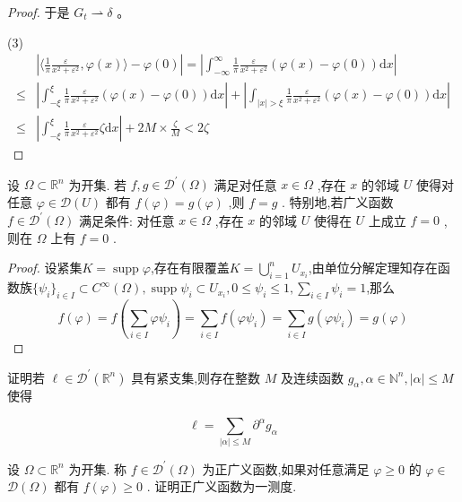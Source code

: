 \documentclass[lang=cn,newtx,10pt,scheme=chinese,thmcnt=chapter]{elegantbook}
\newcommand{\dif}{\mathrm{d}}
\begin{document}
\begin{problemset}
\begin{proof}
于是 $G_t \rightharpoonup \delta$ 。

    (3)    \begin{equation*}
        \begin{aligned}
          & \left| \langle \frac{1}{\pi }\frac{\varepsilon }{{x}^{2} + {\varepsilon }^{2}},\varphi(x)\rangle-\varphi(0)\right|=\left|\int_{-\infty}^\infty \frac{1}{\pi }\frac{\varepsilon }{{x}^{2} + {\varepsilon }^{2}} (\varphi(x)-\varphi(0))\dif x \right|\\
           \leqslant& \left|\int_{-\xi}^\xi\frac{1}{\pi }\frac{\varepsilon }{{x}^{2} + {\varepsilon }^{2}} (\varphi(x)-\varphi(0))\dif x \right|+ \left|\int_{|x|>\xi} \frac{1}{\pi }\frac{\varepsilon }{{x}^{2} + {\varepsilon }^{2}} (\varphi(x)-\varphi(0))\dif x \right|
           \\           \leqslant &\left|\int_{-\xi}^\xi \frac{1}{\pi }\frac{\varepsilon }{{x}^{2} + {\varepsilon }^{2}} \zeta\dif x \right|+ 2M\times\frac{\zeta}{M}<2\zeta
        \end{aligned}
    \end{equation*}
\end{proof}
\item 设 \(\Omega  \subset  {\mathbb{R}}^{n}\) 为开集. 若 \(f,g \in  {\mathcal{D}}^{\prime }\left( \Omega \right)\) 满足对任意 \(x \in  \Omega\) ,存在 \(x\) 的邻域 \(U\) 使得对任意 \(\varphi  \in  \mathcal{D}\left( U\right)\) 都有 \(f\left( \varphi \right)  = g\left( \varphi \right)\) ,则 \(f = g\) . 特别地,若广义函数 \(f \in  {\mathcal{D}}^{\prime }\left( \Omega \right)\) 满足条件: 对任意 \(x \in  \Omega\) ,存在 \(x\) 的邻域 \(U\) 使得在 \(U\) 上成立 \(f = 0\) ,则在 \(\Omega\) 上有 \(f = 0\) .
\begin{proof}
    设紧集$K=\operatorname{supp}\varphi$,存在有限覆盖$K=\bigcup\limits_{i=1}^nU_{x_i}$,由单位分解定理知存在函数族$\{\psi_i\}_{i\in I}\subset C^\infty(\Omega),\operatorname{supp}\psi_i\subset U_{x_i},0\leqslant \psi_i\leqslant 1,\sum\limits_{i\in I}\psi_i=1$,那么
    \[f(\varphi)=f\left(\sum\limits_{i\in I}\varphi\psi_i\right)=\sum\limits_{i\in  I}f(\varphi\psi_i)=\sum\limits_{i\in  I}g(\varphi\psi_i)=g(\varphi)\]
    
    
\end{proof}
\item 证明若 \(\ell  \in  {\mathcal{D}}^{\prime }\left( {\mathbb{R}}^{n}\right)\) 具有紧支集,则存在整数 \(M\) 及连续函数 \({g}_{\alpha },\alpha  \in  {\mathbb{N}}^{n},\left| \alpha \right|  \leqslant  M\) 使得

\begin{equation*}
\ell  = \mathop{\sum }\limits_{{\left| \alpha \right|  \leqslant  M}}{\partial }^{\alpha }{g}_{\alpha }
\end{equation*}

\item 设 \(\Omega  \subset  {\mathbb{R}}^{n}\) 为开集. 称 \(f \in  {\mathcal{D}}^{\prime }\left( \Omega \right)\) 为正广义函数,如果对任意满足 \(\varphi  \geq  0\) 的 \(\varphi  \in\)  \(\mathcal{D}\left( \Omega \right)\) 都有 \(f\left( \varphi \right)  \geq  0\) . 证明正广义函数为一测度.



\end{problemset}
\end{document}
